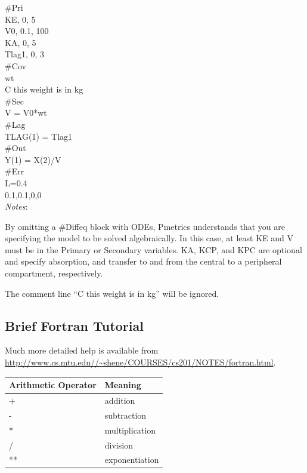 \documentclass[
]{book}
\begin{document}
\#Pri\\
KE, 0, 5\\
V0, 0.1, 100\\
KA, 0, 5\\
Tlag1, 0, 3\\

\#Cov\\
wt\\
C this weight is in kg\\

\#Sec\\
V = V0*wt\\

\#Lag\\
TLAG(1) = Tlag1\\

\#Out\\
Y(1) = X(2)/V\\

\#Err\\
L=0.4\\
0.1,0.1,0,0\\

\emph{Notes}:

By omitting a \#Diffeq block with ODEs, Pmetrics understands that you
are specifying the model to be solved algebraically. In this case, at
least KE and V must be in the Primary or Secondary variables. KA, KCP,
and KPC are optional and specify absorption, and transfer to and from
the central to a peripheral compartment, respectively.

The comment line ``C this weight is in kg'' will be ignored.

\hypertarget{brief-fortran-tutorial}{%
\subsection{Brief Fortran Tutorial}\label{brief-fortran-tutorial}}

Much more detailed help is available from
\url{http://www.cs.mtu.edu//~shene/COURSES/cs201/NOTES/fortran.html}.

\begin{tabular}{l|l}
\hline
Arithmetic Operator & Meaning\\
\hline
+ & addition\\
\hline
- & subtraction\\
\hline
* & multiplication\\
\hline
/ & division\\
\hline
** & exponentiation\\
\hline
\end{tabular}
\end{document}
